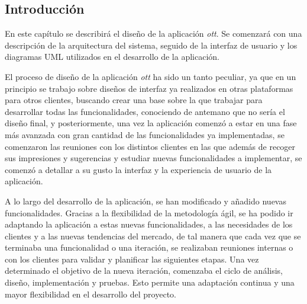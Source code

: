 \subsection{Introducción}
\label{sec:diseno:ott:introduccion}

En este capítulo se describirá el diseño de la aplicación \textit{ott}. Se comenzará con una 
descripción de la arquitectura del sistema, seguido de la interfaz de usuario y los diagramas UML 
utilizados en el desarrollo de la aplicación.

El proceso de diseño de la aplicación \textit{ott} ha sido un tanto peculiar, ya que en un principio
se trabajo sobre diseños de interfaz ya realizados en otras plataformas para otros clientes, buscando crear
una base sobre la que trabajar para desarrollar todas las funcionalidades, conociendo de antemano
que no sería el diseño final, y posteriormente, una vez la aplicación comenzó a estar en una fase más avanzada 
con gran cantidad de las funcionalidades ya implementadas, se comenzaron las reuniones con los distintos 
clientes en las que además de recoger sus impresiones y sugerencias y estudiar nuevas funcionalidades
a implementar, se comenzó a detallar a su gusto la interfaz y la experiencia de usuario de la aplicación.

A lo largo del desarrollo de la aplicación, se han modificado y añadido nuevas funcionalidades. 
Gracias a la flexibilidad de la metodología ágil, se ha podido ir adaptando la aplicación a estas
nuevas funcionalidades, a las necesidades de los clientes y a las nuevas tendencias del mercado, de tal 
manera que cada vez que se terminaba una funcionalidad o una iteración, se realizaban reuniones internas o 
con los clientes para validar y planificar las siguientes etapas. Una vez determinado el objetivo de la 
nueva iteración, comenzaba el ciclo de análisis, diseño, implementación y pruebas. Esto permite una
adaptación continua y una mayor flexibilidad en el desarrollo del proyecto. 


